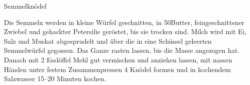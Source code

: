 \begin{recipe}[\vegetarian]{Semmelknödel}%

    \begin{ingredients}
    \end{ingredients}

    \begin{instructions}
        Die Semmeln werden in kleine Würfel geschnitten, in 50\gram Butter, feingeschnittener Zwiebel und gehackter Petersilie geröstet, bis sie trocken sind.
        Milch wird mit Ei, Salz und Muskat abgesprudelt und über die in eine Schüssel geleerten Semmelwürfel gegossen.
        Das Ganze rasten lassen, bis die Masse angezogen hat.
        Danach mit 2 Esslöffel Mehl gut vermischen und anziehen lassen, mit nassen Händen unter festem Zusammenpressen 4 Knödel formen und in kochendem Salzwasser 15--20 Minuten kochen.
    \end{instructions}
\end{recipe}
